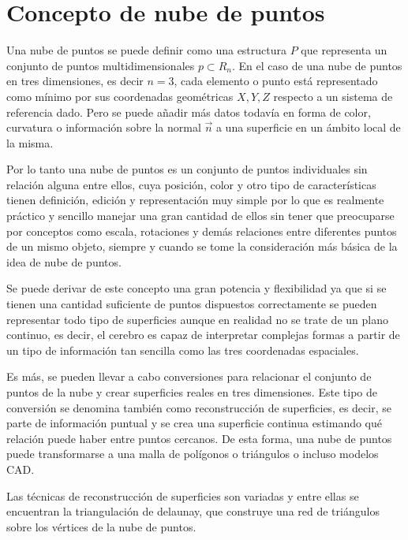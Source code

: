 \section{Concepto de nube de puntos} \label{section:nubes_ejemplo}

Una nube de puntos se puede definir como una estructura $P$ que representa un conjunto de puntos multidimensionales $p \subset R_{n}$. En el caso de una nube de puntos en tres dimensiones, es decir $n=3$, cada elemento o punto está representado como mínimo por sus coordenadas geométricas $X,Y, Z$ respecto a un sistema de referencia dado. Pero se puede añadir más datos todavía en forma de color, curvatura o información sobre la normal $\vec{n}$ a una superficie en un ámbito local de la misma.  


Por lo tanto una nube de puntos es un conjunto de puntos individuales sin relación alguna entre ellos, cuya
posición, color y otro tipo de características tienen definición, edición y representación muy simple por lo
que es realmente práctico y sencillo manejar una gran cantidad de ellos sin tener que preocuparse por
conceptos como escala, rotaciones y demás relaciones entre diferentes puntos de un mismo objeto, siempre y cuando se tome la consideración más básica de la idea de nube de puntos.


Se puede derivar de este concepto una gran potencia y flexibilidad ya que si se tienen una cantidad
suficiente de puntos dispuestos correctamente se pueden representar todo tipo de superficies aunque en
realidad no se trate de un plano continuo, es decir, el cerebro es capaz de interpretar complejas formas a
partir de un tipo de información tan sencilla como las tres coordenadas espaciales.

Es más, se pueden llevar a cabo conversiones para relacionar el conjunto de puntos de la nube y crear
superficies reales en tres dimensiones. Este tipo de conversión se denomina también como reconstrucción de superficies, es decir, se parte de información puntual y se crea una superficie continua estimando qué
relación puede haber entre puntos cercanos. De esta forma, una nube de puntos puede transformarse a una
malla de polígonos o triángulos o incluso modelos CAD.

Las técnicas de reconstrucción de superficies son variadas y entre ellas se encuentran la triangulación de
delaunay, que construye una red de triángulos sobre los vértices de la nube de puntos.


